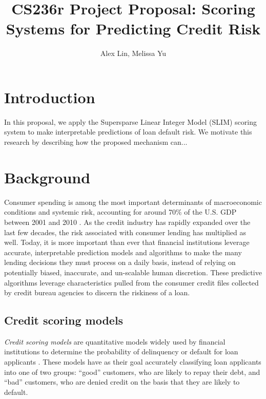 \documentclass[11pt, margin=1in]{article}
\begin{document}
	
\title{CS236r Project Proposal: Scoring Systems for Predicting Credit Risk}
\author{Alex Lin, Melissa Yu}
\date{}
\maketitle

\section{Introduction}
In this proposal, we apply the  Supersparse Linear Integer Model (SLIM) scoring system to make interpretable predictions of loan default risk. We motivate this research by describing how the proposed mechanism can...

\section{Background}

Consumer spending is among the most important determinants of macroeconomic conditions and systemic risk, accounting for around 70\% of the U.S. GDP between 2001 and 2010 \cite{ml-for-risk}. As the credit industry has rapidly expanded over the last few decades, the risk associated with consumer lending has multiplied as well. Today, it is more important than ever that financial institutions leverage accurate, interpretable prediction models and algorithms to make the many lending decisions they must process on a daily basis, instead of relying on potentially biased, inaccurate, and un-scalable human discretion. These predictive algorithms leverage characteristics pulled from the consumer credit files collected by credit bureau agencies to discern the riskiness of a loan.

\subsection{Credit scoring models} 
\textit{Credit scoring models} are quantitative models widely used by financial institutions to determine the probability of delinquency or default for loan applicants \cite{genetic-ong, nn-scoring-models}. These models have as their goal accurately classifying loan applicants into one of two groups: ``good'' customers, who are likely to repay their debt, and ``bad'' customers, who are denied credit on the basis that they are likely to default.
\end{document}
